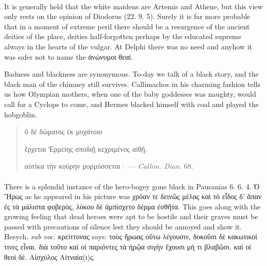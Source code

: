 \documentclass[a4paper, 11pt, oneside, polutonikogreek, english]{article}
\begin{document}
\paragraph{}
It is generally held that the white maidens are Artemis and Athene, but this view only rests on the opinion of Diodorus (22. 9. 5). Surely it is far more probable that in a moment of extreme peril there should be a resurgence of the ancient deities of the place, deities half-forgotten perhaps by the educated supreme always in the hearts of the vulgar. At Delphi there was no need and anyhow it was safer not to name the ἀνώνυμοι θεαί.

Badness and blackness are synonymous. To-day we talk of a black story, and the black man of the chimney still survives. Callimachos in his charming fashion tells us how Olympian mothers, when one of the baby goddesses was naughty, would call for a Cyclops to come, and Hermes blacked himself with coal and played the hobgoblin.
\begin{quotation}
\large
\hspace*{10mm}ὃ δὲ δώματος ἐκ μυχάτοιο

ἔρχεται Ἑρμείης σποδιῇ κεχριμένος αἰθῇ.

αὐτίκα τὴν κούρην μορμύσσεται· --- \emph{Callim. Dian.} 68.
\end{quotation}
\paragraph{}
There is a splendid instance of the hero-bogey gone black in Pausanias 6. 6. 4. Ὁ Ἥρως as he appeared in his picture was χρόαν τε δεινῶς μέλας καὶ τὸ εἶδος δ' ἅπαν ἐς τὰ μάλιστα φοβερὸς, λύκου δὲ ἀμπίσχετο δέρμα ἐσθῆτα. This goes along with the growing feeling that dead heroes were apt to be hostile and their graves must be passed with precautions of silence lest they should be annoyed and show it. Hesych. \emph{sub voc.} κρείττονας says: τοὺς ἥρωας οὕτω λέγουσιν, δοκοῦσι δὲ κακωτικοί τινες εἶναι. διὰ τοῦτο καὶ οἱ παριόντες τὰ ἡρῷα σιγὴν ἔχουσι μή τι βλαβῶσι. καὶ οἱ θεοὶ δέ. Αἰσχύλος Αἰτναία(ι)ς.
\end{document}
